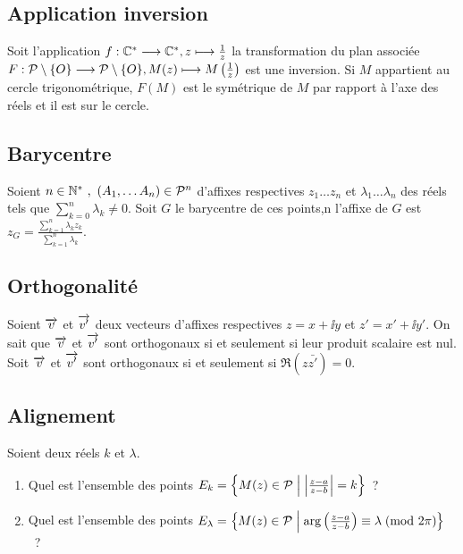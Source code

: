 \subsection{Application inversion}
\label{subsec:appinverse}

Soit l'application \(f:\mathbb{C}^* \longrightarrow \mathbb{C}^*, z \longmapsto \frac{1}{z}\) la 
transformation du plan associée \(F:\mathcal{P} \setminus\{O\} \longrightarrow \mathcal{P} 
\setminus\{O\}, M(z) \longmapsto M \left( \frac{1}{z} \right)\) est une inversion. Si 
\(M\) appartient au cercle trigonométrique, \(F(M)\) est le symétrique de \(M\) 
par rapport à l'axe des réels et il est sur le cercle.

\subsection{Barycentre}
\label{subsec:complexebarycentre}

Soient \(n \in \mathbb{N}^{*} \ , \ (A_1, \ldots A_n) \in \mathcal{P}^n\)  d'affixes respectives 
\(z_1 \ldots z_n\) et \(\lambda_1 \ldots \lambda_n\) des réels tels que 
\(\sum_{k = 0}^{n} \lambda_k \neq 0\). Soit \(G\) le barycentre de ces points,n 
l'affixe de \(G\) est \(z_G = \frac{\sum_{k = 1}^{n}\lambda_k 
z_k}{\sum_{k = 1}^{n}\lambda_k}\).

\subsection{Orthogonalité}
\label{subsec:complexeorthogonalite}

Soient \(\overrightarrow{v}\) et \(\overrightarrow{v'}\) deux vecteurs d'affixes respectives 
\(z = x + \ii y\) et \(z' = x' + \ii y'\). On sait que \(\overrightarrow{v}\) et \(\overrightarrow{v'}\) 
sont orthogonaux si et seulement si leur produit scalaire est nul. Soit 
\(\overrightarrow{v}\) et \(\overrightarrow{v'}\) sont orthogonaux si et seulement si \(\Re(z 
\bar{z'}) = 0\).

\subsection{Alignement}
\label{subsec:complexealignement}

Soient deux réels \(k\) et \(\lambda\).
\begin{enumerate}
    \item Quel est l'ensemble des points \(E_k = \left\{M(z) \in 
        \mathcal{P}\mathrel{}\middle|\mathrel{}\left\lvert\frac{z-a}{z-b}\right\rvert = k\right\}\)~?
    \item Quel est l'ensemble des points \(E_\lambda = \left\{M(z) \in 
        \mathcal{P}\mathrel{}\middle|\mathrel{}\arg \left(\frac{z-a}{z-b} \right) \equiv \lambda\!\pmod {2\pi}\right\}\)~?
\end{enumerate}

